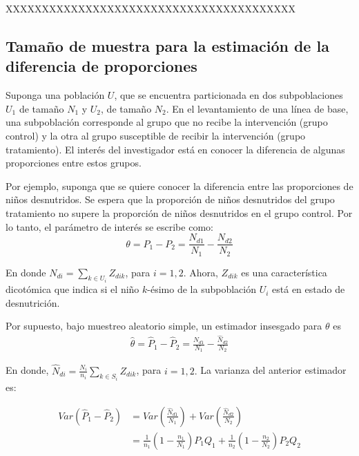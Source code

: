 \documentclass[
  12pt,
  spanish,
]{book}
\begin{document}
XXXXXXXXXXXXXXXXXXXXXXXXXXXXXXXXXXXXXXXX

\hypertarget{tamauxf1o-de-muestra-para-la-estimaciuxf3n-de-la-diferencia-de-proporciones}{%
\subsection{Tamaño de muestra para la estimación de la diferencia de proporciones}\label{tamauxf1o-de-muestra-para-la-estimaciuxf3n-de-la-diferencia-de-proporciones}}

Suponga una población \(U\), que se encuentra particionada en dos subpoblaciones \(U_1\) de tamaño \(N_1\) y \(U_2\), de tamaño \(N_2\). En el levantamiento de una línea de base, una subpoblación corresponde al grupo que no recibe la intervención (grupo control) y la otra al grupo susceptible de recibir la intervención (grupo tratamiento). El interés del investigador está en conocer la diferencia de algunas proporciones entre estos grupos.

Por ejemplo, suponga que se quiere conocer la diferencia entre las proporciones de niños desnutridos. Se espera que la proporción de niños desnutridos del grupo tratamiento no supere la proporción de niños desnutridos en el grupo control. Por lo tanto, el parámetro de interés se escribe como:
\begin{equation}
\theta=P_1-P_2=\frac{N_{d1}}{N_1}-\frac{N_{d2}}{N_2}
\end{equation}

En donde \(N_{di}=\sum_{k\in U_i}Z_{dik}\), para \(i=1,2.\) Ahora, \(Z_{dik}\) es una característica dicotómica que indica si el niño \(k\)-ésimo de la subpoblación \(U_i\) está en estado de desnutrición.

Por supuesto, bajo muestreo aleatorio simple, un estimador insesgado para \(\theta\) es
\begin{align}
\hat{\theta}=\hat{P}_1-\hat{P}_2=\frac{\hat{N}_{d1}}{N_1}-\frac{\hat{N}_{d2}}{N_2}
\end{align}

En donde, \(\hat{N}_{di}=\frac{N_i}{n_i}\sum_{k\in S_i}Z_{dik}\), para \(i=1,2.\) La varianza del anterior estimador es:

\begin{align*}
Var(\hat{P}_1-\hat{P}_2)&=Var\left(\frac{\hat{N}_{d1}}{N_1}\right)+Var\left(\frac{\hat{N}_{d2}}{N_2}\right)\\
&=\frac{1}{n_1}\left(1-\frac{n_1}{N_1}\right)P_1Q_1+\frac{1}{n_2}\left(1-\frac{n_2}{N_2}\right)P_2Q_2
\end{align*}
\end{document}
